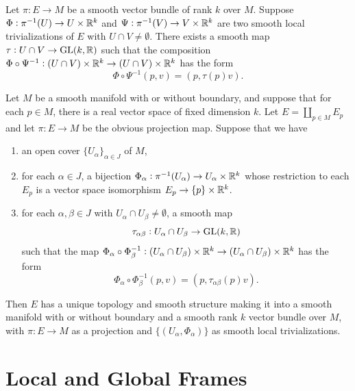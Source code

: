 \begin{lemma}
    Let $\pi: E\to M$ be a smooth vector bundle of rank $k$ over $M$. Suppose $\Phi:\pi^{-1}(U)\to U\times\mathbb{R}^k$ and $\Psi:\pi^{-1}(V)\to V\times\mathbb{R}^k$ are two smooth local trivializations of $E$ with $U\cap V\ne\emptyset$. There exists a smooth map $\tau: U\cap V\to\operatorname{GL}(k,\mathbb{R})$ such that the composition $\Phi\circ\Psi^{-1}:(U\cap V)\times\mathbb{R}^k\to(U\cap V)\times\mathbb{R}^k$ has the form 
    \begin{equation*}
        \Phi\circ\Psi^{-1}(p, v) = (p,\tau(p)v).
    \end{equation*}
\end{lemma}

\begin{lemma}
    Let $M$ be a smooth manifold with or without boundary, and suppose that for each $p\in M$, there is a real vector space of fixed dimension $k$. Let $E = \coprod_{p\in M} E_p$ and let $\pi: E\to M$ be the obvious projection map. Suppose that we have 
    \begin{enumerate}[label=(\alph*)]
        \item an open cover $\{U_\alpha\}_{\alpha\in J}$ of $M$, 
        \item for each $\alpha\in J$, a bijection $\Phi_\alpha:\pi^{-1}(U_\alpha)\to U_\alpha\times\mathbb{R}^k$ whose restriction to each $E_p$ is a vector space isomorphism $E_p\to \{p\}\times\mathbb{R}^k$.
        \item for each $\alpha,\beta\in J$ with $U_\alpha\cap U_\beta\ne\emptyset$, a smooth map 
        \begin{equation*}
            \tau_{\alpha\beta}: U_\alpha\cap U_\beta\to \operatorname{GL}(k,\mathbb{R})
        \end{equation*}
        such that the map $\Phi_\alpha\circ\Phi_{\beta}^{-1}: (U_\alpha\cap U_\beta)\times\mathbb{R}^k\to(U_\alpha\cap U_\beta)\times\mathbb{R}^k$ has the form 
        \begin{equation*}
            \Phi_\alpha\circ\Phi_\beta^{-1}(p, v) = \left(p, \tau_{\alpha\beta}(p)v\right).
        \end{equation*}
    \end{enumerate}
    Then $E$ has a unique topology and smooth structure making it into a smooth manifold with or without boundary and a smooth rank $k$ vector bundle over $M$, with $\pi: E\to M$ as a projection and $\{(U_\alpha,\Phi_\alpha)\}$ as smooth local trivializations.
\end{lemma}

\section{Local and Global Frames}

